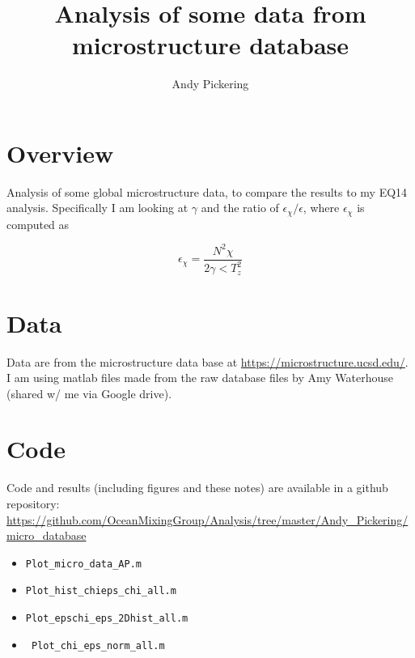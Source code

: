 \documentclass[11pt]{article}
\title{Analysis of some data from microstructure database}
\author{Andy Pickering}
\begin{document}
\maketitle

\tableofcontents
\newpage

\section{Overview}

Analysis of some global microstructure data, to compare the results to my EQ14 analysis. Specifically I am looking at $\gamma$ and the ratio of $\epsilon_{\chi}/\epsilon$, where $\epsilon_{\chi}$ is computed as 

\begin{equation}
\epsilon_{\chi} = \frac{N^2\chi}{2\gamma<T_{z}^{2}}
\end{equation}


\section{Data}

Data are from the microstructure data base at \url{https://microstructure.ucsd.edu/}. I am using matlab files made from the raw database files by Amy Waterhouse (shared w/ me via Google drive). 


\section{Code}

Code and results (including figures and these notes) are available in a github repository: \url{https://github.com/OceanMixingGroup/Analysis/tree/master/Andy_Pickering/micro_database}

\begin{itemize}

\item \verb+Plot_micro_data_AP.m+

\item \verb+Plot_hist_chieps_chi_all.m+

\item \verb+Plot_epschi_eps_2Dhist_all.m+

\item \verb+ Plot_chi_eps_norm_all.m+

\end{itemize}


%
%
%
%
\end{document}
